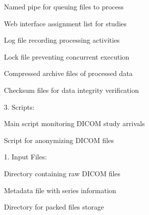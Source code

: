 \documentclass[letterpaper,10pt,english]{sphinxmanual}
\begin{document}
\begin{DUlineblock}{0em}
\item[] \sphinxhyphen{}  \sphinxhyphen{} Named pipe for queuing files to process
\item[] \sphinxhyphen{}  \sphinxhyphen{} Web interface assignment list for studies
\item[] \sphinxhyphen{}  \sphinxhyphen{} Log file recording processing activities
\item[] \sphinxhyphen{}  \sphinxhyphen{} Lock file preventing concurrent execution
\item[] \sphinxhyphen{}  \sphinxhyphen{} Compressed archive files of processed data
\item[] \sphinxhyphen{}  \sphinxhyphen{} Checksum files for data integrity verification
\end{DUlineblock}

\begin{DUlineblock}{0em}
\item[] 3. Scripts:
\end{DUlineblock}

\begin{DUlineblock}{0em}
\item[] \sphinxhyphen{}  \sphinxhyphen{} Main script monitoring DICOM study arrivals
\item[] \sphinxhyphen{}  \sphinxhyphen{} Script for anonymizing DICOM files
\end{DUlineblock}

\sphinxAtStartPar
{}


\sphinxAtStartPar
{}

\begin{DUlineblock}{0em}
\item[] 1. Input Files:
\end{DUlineblock}

\begin{DUlineblock}{0em}
\item[] \sphinxhyphen{}  \sphinxhyphen{} Directory containing raw DICOM files
\item[] \sphinxhyphen{}  \sphinxhyphen{} Metadata file with series information
\item[] \sphinxhyphen{}  \sphinxhyphen{} Directory for packed files storage
\end{DUlineblock}
\end{document}
